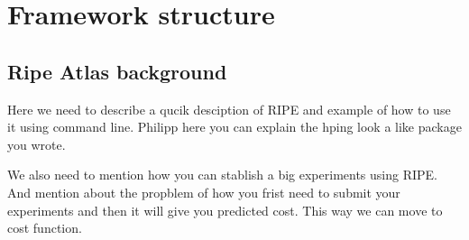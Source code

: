 \section{Framework structure}
\subsection{Ripe Atlas background}
Here we need to describe a qucik desciption of RIPE and example of how to use it using command line. 
Philipp here you can explain the hping look a like package you wrote. 

We also need to mention how you can stablish a big experiments using RIPE. And mention about the propblem of how you frist need to submit your experiments and then it will give you predicted cost. This way we can move to cost function.

